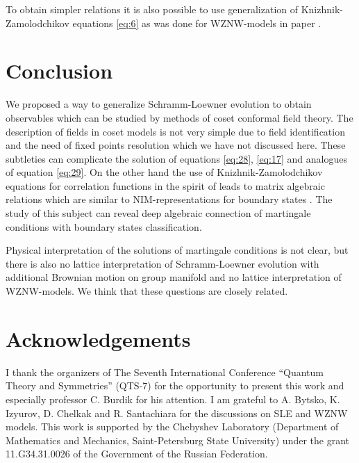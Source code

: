 \documentclass[a4paper]{jpconf}
\theoremstyle{definition}
\theoremstyle{definition} \newtheorem{Def}{Definition}
\begin{document}
To obtain simpler relations it is also possible to use generalization of Knizhnik-Zamolodchikov equations \eqref{eq:6} as was done for WZNW-models in paper \cite{alekseev2010sle}. 

\section{Conclusion}
\label{sec:conclusion}

We proposed a way to generalize Schramm-Loewner evolution to obtain observables which can be studied by methods of coset conformal field theory. The description of fields in coset models is not very simple due to field identification \cite{schellekens1990field} and the need of  fixed points resolution \cite{Fuchs:1996dd,fuchs1996resolution} which we have not discussed here. These subtleties can complicate the solution of equations  \eqref{eq:28}, \eqref{eq:17} and analogues of equation \eqref{eq:29}. On the other hand the use of Knizhnik-Zamolodchikov equations \cite{kogan1997knizhnik} for correlation functions in the spirit of \cite{alekseev2010sle} leads to matrix algebraic relations which are similar to NIM-representations for boundary states \cite{ishikawa2003novel}. The study of this subject can reveal deep algebraic connection of martingale conditions with boundary states classification. 

Physical interpretation of the solutions of martingale conditions is not clear, but there is also no lattice interpretation of Schramm-Loewner evolution with additional Brownian motion on group manifold \cite{bettelheim2005stochastic} and no lattice interpretation of WZNW-models. We think that these questions are closely related.

\section*{Acknowledgements}
\label{sec:acknowledgements}
I thank the organizers of The Seventh International Conference ``Quantum Theory and Symmetries'' (QTS-7) for the opportunity to present this work and especially professor C. Burdik for his attention. I am grateful to A. Bytsko, K. Izyurov, D. Chelkak and R. Santachiara for the discussions on SLE and WZNW models. This work  is supported by
the Chebyshev Laboratory (Department of Mathematics and Mechanics,
Saint-Petersburg State University) under the grant 11.G34.31.0026
of the Government of the Russian Federation.



{}

\end{document}
